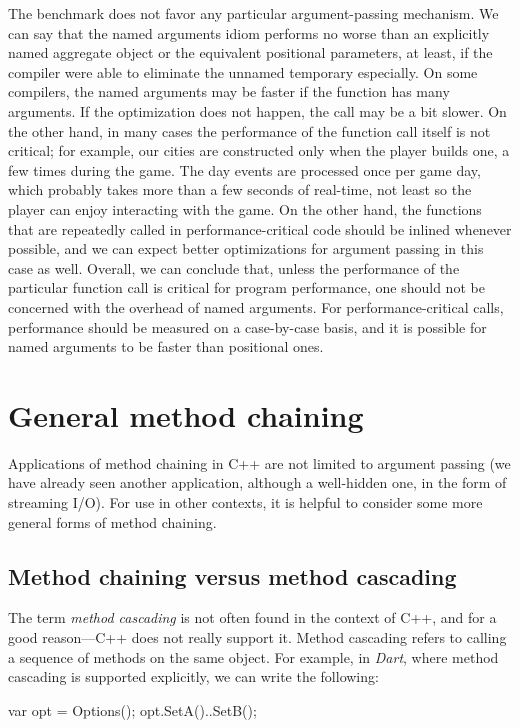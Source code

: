 The benchmark does not favor any particular argument-passing mechanism. We can say that the named arguments idiom performs no worse than an explicitly named aggregate object or the equivalent positional parameters, at least, if the compiler were able to eliminate the unnamed temporary especially. On some compilers, the named arguments may be faster if the function has many arguments. If the optimization does not happen, the call may be a bit slower. On the other hand, in many cases the performance of the function call itself is not critical; for example, our cities are constructed only when the player builds one, a few times during the game. The day events are processed once per game day, which probably takes more than a few seconds of real-time, not least so the player can enjoy interacting with the game. On the other hand, the functions that are repeatedly called in performance-critical code should be inlined whenever possible, and we can expect better optimizations for argument passing in this case as well. Overall, we can conclude that, unless the performance of the particular function call is critical for program performance, one should not be concerned with the overhead of named arguments. For performance-critical calls, performance should be measured on a case-by-case basis, and it is possible for named arguments to be faster than positional ones.

\section{General method chaining}

Applications of method chaining in C++ are not limited to argument passing (we have already seen another application, although a well-hidden one, in the form of streaming I/O). For use in other contexts, it is helpful to consider some more general forms of method chaining.

\subsection{Method chaining versus method cascading}

The term \emph{method cascading} is not often found in the context of C++, and for a good reason---C++ does not really support it. Method cascading refers to calling a sequence of methods on the same object. For example, in \emph{Dart}, where method cascading is supported explicitly, we can write the following:

\begin{code}
var opt = Options();
opt.SetA()..SetB();
\end{code}


